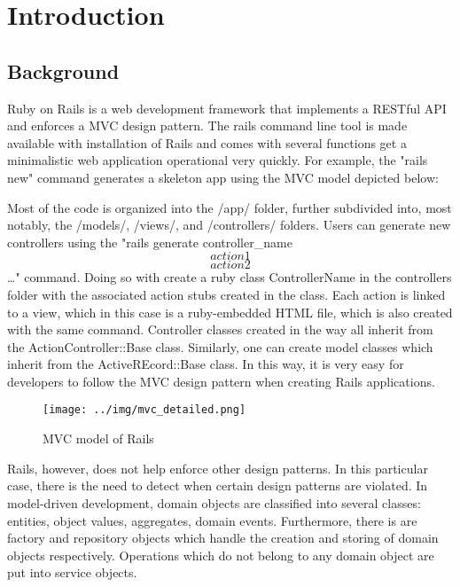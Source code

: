 \chapter{Introduction}

\section{Background}
Ruby on Rails is a web development framework that implements a RESTful API and enforces a MVC design pattern. The rails command line tool is made available with installation of Rails and comes with several functions get a minimalistic web application operational very quickly. For example, the "rails new" command generates a skeleton app using the MVC model depicted below:

Most of the code is organized into the /app/ folder, further subdivided into, most notably, the /models/, /views/, and /controllers/ folders. Users can generate new controllers using the "rails generate controller\_name \[action1\] \[action2\] …" command. Doing so with create a ruby class ControllerName in the controllers folder with the associated action stubs created in the class. Each action is linked to a view, which in this case is a ruby-embedded HTML file, which is also created with the same command. Controller classes created in the way all inherit from the ActionController::Base class. Similarly, one can create model classes which inherit from the ActiveREcord::Base class. In this way, it is very easy for developers to follow the MVC design pattern when creating Rails applications.

\begin{figure}[hbt]
	\begin{center}
		\texttt{[image: ../img/mvc\_detailed.png]}
	\end{center}
	\caption{MVC model of Rails \cite{rails-tutorial}}
	\label{mvc-fig}
\end{figure}

Rails, however, does not help enforce other design patterns. In this particular case, there is the need to detect when certain design patterns are violated. In model-driven development, domain objects are classified into several classes: entities, object values, aggregates, domain events. Furthermore, there is are factory and repository objects which handle the creation and storing of domain objects respectively. Operations which do not belong to any domain object are put into service objects.

